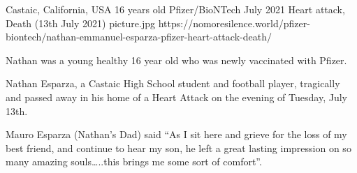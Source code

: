 {Castaic, California, USA}
{16 years old}
{Pfizer/BioNTech}
{July 2021}
{Heart attack, Death (13th July 2021)}
{picture.jpg}
{https://nomoresilence.world/pfizer-biontech/nathan-emmanuel-esparza-pfizer-heart-attack-death/}
{

Nathan was a young healthy 16 year old who was newly vaccinated with Pfizer.

Nathan Esparza, a Castaic High School student and football player, tragically
and passed away in his home of a Heart Attack on the evening of Tuesday, July
13th.

Mauro Esparza (Nathan’s Dad) said “As I sit here and grieve for the loss of my
best friend, and continue to hear my son, he left a great lasting impression on
so many amazing souls…..this brings me some sort of comfort”.

}
